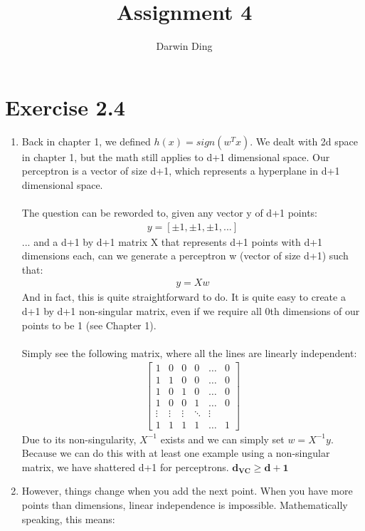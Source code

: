 \documentclass[12pt]{article}
\begin{document}
\title{Assignment 4}
\author{Darwin Ding}
\maketitle

\section*{Exercise 2.4}
\begin{enumerate}[label=(\alph*)]
	\item Back in chapter 1, we defined $h(x) = sign(w^Tx)$. We dealt with 2d space in chapter 1, but the math still applies to d+1 dimensional space. Our perceptron is a vector of size d+1, which represents a hyperplane in d+1 dimensional space.
	\\ \\ The question can be reworded to, given any vector y of d+1 points:
	\begin{gather*}
		y = [\pm1, \pm1, \pm1, ...]
	\end{gather*}
	... and a d+1 by d+1 matrix X that represents d+1 points with d+1 dimensions each, can we generate a perceptron w (vector of size d+1) such that:
	\begin{gather*}
		y = Xw
	\end{gather*}
	And in fact, this is quite straightforward to do. It is quite easy to create a d+1 by d+1 non-singular matrix, even if we require all 0th dimensions of our points to be 1 (see Chapter 1).
	\\ \\ Simply see the following matrix, where all the lines are linearly independent:
	\begin{gather*}
		\begin{bmatrix}
		1 & 0 & 0 & 0 & \dots  & 0 \\
		1 & 1 & 0 & 0 & \dots  & 0 \\
		1 & 0 & 1 & 0 & \dots  & 0 \\
		1 & 0 & 0 & 1 & \dots  & 0 \\
		\vdots & \vdots & \vdots & \ddots & \vdots \\
		1 & 1 & 1 & 1 & \dots  & 1
		\end{bmatrix}
	\end{gather*}
	Due to its non-singularity, $X^{-1}$ exists and we can simply set $w = X^{-1}y$. Because we can do this with at least one example using a non-singular matrix, we have shattered d+1 for perceptrons. $\boldsymbol{d_{VC} \ge d + 1}$
	\item However, things change when you add the next point. When you have more points than dimensions, linear independence is impossible. Mathematically speaking, this means:

\end{enumerate}
\end{document}
